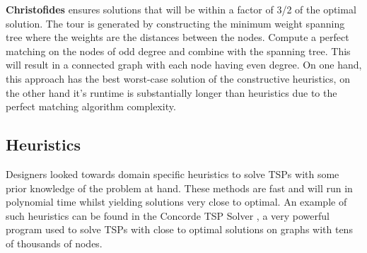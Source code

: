 \documentclass[]{UCD_CS_FYP_Report}
\begin{document}
\textbf{Christofides} ensures solutions that will be within a factor of 3/2 of the optimal solution. The tour is generated by constructing the minimum weight spanning tree where the weights are the distances between the nodes. Compute a perfect matching on the nodes of odd degree and combine with the spanning tree. This will result in a connected graph with each node having even degree. On one hand, this approach has the best worst-case solution of the constructive heuristics, on the other hand it's runtime is substantially longer than heuristics due to the perfect matching algorithm complexity.

\subsection{Heuristics}
Designers looked towards domain specific heuristics to solve TSPs with some prior knowledge of the problem at hand. These methods are fast and will run in polynomial time whilst yielding solutions very close to optimal. An example of such heuristics can be found in the Concorde TSP Solver \cite{davidapplegate2007}, a very powerful program used to solve TSPs with close to optimal solutions on graphs with tens of thousands of nodes.
\end{document}
